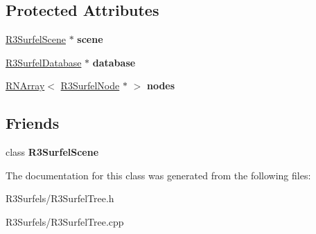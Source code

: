 \subsection*{Protected Attributes}
\begin{DoxyCompactItemize}
\item 
\hyperlink{class_r3_surfel_scene}{R3\+Surfel\+Scene} $\ast$ {\bfseries scene}\hypertarget{class_r3_surfel_tree_a539c3395878b18d64161abc9a031945d}{}\label{class_r3_surfel_tree_a539c3395878b18d64161abc9a031945d}

\item 
\hyperlink{class_r3_surfel_database}{R3\+Surfel\+Database} $\ast$ {\bfseries database}\hypertarget{class_r3_surfel_tree_ac7ffc4e198f2d4849009b91cde00cfa9}{}\label{class_r3_surfel_tree_ac7ffc4e198f2d4849009b91cde00cfa9}

\item 
\hyperlink{class_r_n_array}{R\+N\+Array}$<$ \hyperlink{class_r3_surfel_node}{R3\+Surfel\+Node} $\ast$ $>$ {\bfseries nodes}\hypertarget{class_r3_surfel_tree_ae5067b7c9cba8c66d3fd79c6b23c3d11}{}\label{class_r3_surfel_tree_ae5067b7c9cba8c66d3fd79c6b23c3d11}

\end{DoxyCompactItemize}
\subsection*{Friends}
\begin{DoxyCompactItemize}
\item 
class {\bfseries R3\+Surfel\+Scene}\hypertarget{class_r3_surfel_tree_af9bb32c0eac7d1d54787bbc6b44586b6}{}\label{class_r3_surfel_tree_af9bb32c0eac7d1d54787bbc6b44586b6}

\end{DoxyCompactItemize}


The documentation for this class was generated from the following files\+:\begin{DoxyCompactItemize}
\item 
R3\+Surfels/R3\+Surfel\+Tree.\+h\item 
R3\+Surfels/R3\+Surfel\+Tree.\+cpp\end{DoxyCompactItemize}
